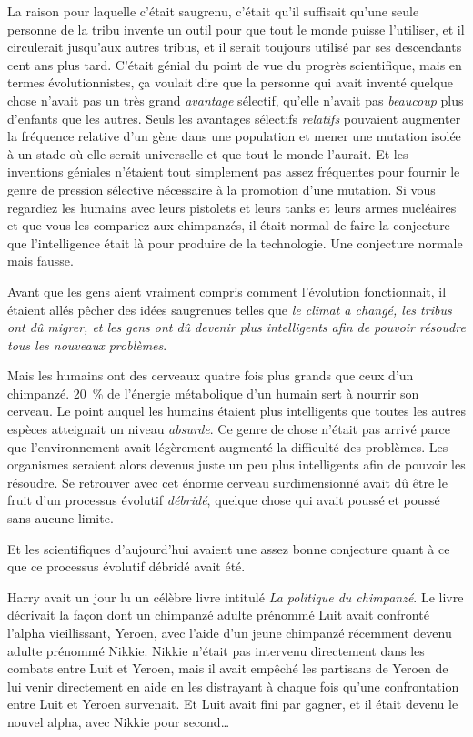 La raison pour laquelle c'était saugrenu, c'était qu'il suffisait qu'une seule personne de la tribu invente un outil pour que tout le monde puisse l'utiliser, et il circulerait jusqu'aux autres tribus, et il serait toujours utilisé par ses descendants cent ans plus tard. C'était génial du point de vue du progrès scientifique, mais en termes évolutionnistes, ça voulait dire que la personne qui avait inventé quelque chose n'avait pas un très grand \emph{avantage} sélectif, qu'elle n'avait pas \emph{beaucoup} plus d'enfants que les autres. Seuls les avantages sélectifs \emph{relatifs} pouvaient augmenter la fréquence relative d'un gène dans une population et mener une mutation isolée à un stade où elle serait universelle et que tout le monde l'aurait. Et les inventions géniales n'étaient tout simplement pas assez fréquentes pour fournir le genre de pression sélective nécessaire à la promotion d'une mutation. Si vous regardiez les humains avec leurs pistolets et leurs tanks et leurs armes nucléaires et que vous les compariez aux chimpanzés, il était normal de faire la conjecture que l'intelligence était là pour produire de la technologie. Une conjecture normale mais fausse.

Avant que les gens aient vraiment compris comment l'évolution fonctionnait, il étaient allés pêcher des idées saugrenues telles que \emph{le climat a changé, les tribus ont dû migrer, et les gens ont dû devenir plus intelligents afin de pouvoir résoudre tous les nouveaux problèmes}.

Mais les humains ont des cerveaux quatre fois plus grands que ceux d'un chimpanzé. 20~\% de l'énergie métabolique d'un humain sert à nourrir son cerveau. Le point auquel les humains étaient plus intelligents que toutes les autres espèces atteignait un niveau \emph{absurde}. Ce genre de chose n'était pas arrivé parce que l'environnement avait légèrement augmenté la difficulté des problèmes. Les organismes seraient alors devenus juste un peu plus intelligents afin de pouvoir les résoudre. Se retrouver avec cet énorme cerveau surdimensionné avait dû être le fruit d'un processus évolutif \emph{débridé}, quelque chose qui avait poussé et poussé sans aucune limite.

Et les scientifiques d'aujourd'hui avaient une assez bonne conjecture quant à ce que ce processus évolutif débridé avait été.

Harry avait un jour lu un célèbre livre intitulé \emph{La politique du chimpanzé}. Le livre décrivait la façon dont un chimpanzé adulte prénommé Luit avait confronté l'alpha vieillissant, Yeroen, avec l'aide d'un jeune chimpanzé récemment devenu adulte prénommé Nikkie. Nikkie n'était pas intervenu directement dans les combats entre Luit et Yeroen, mais il avait empêché les partisans de Yeroen de lui venir directement en aide en les distrayant à chaque fois qu'une confrontation entre Luit et Yeroen survenait. Et Luit avait fini par gagner, et il était devenu le nouvel alpha, avec Nikkie pour second…

